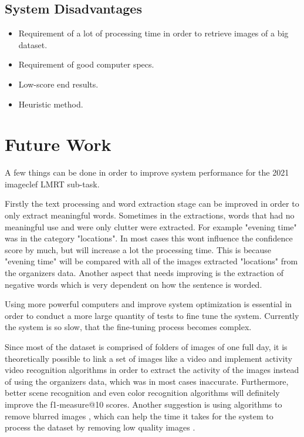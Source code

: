 \subsection{System Disadvantages}

\begin{itemize}
    \itemsep0em
    \item Requirement of a lot of processing time in order to retrieve images of a big dataset.
    \item Requirement of  good computer specs.
    \item Low-score end results.
    \item Heuristic method.
\end{itemize}

\section{Future Work}

A few things can be done in order to improve system performance for the 2021 imageclef LMRT sub-task.

Firstly the text processing and word extraction stage can be improved in order to only extract meaningful words. Sometimes in the extractions, words that had no meaningful use and were only clutter were extracted. For example "evening time" was in the category "locations". In most cases this wont influence the confidence score by much, but will increase a lot the processing time. This is because "evening time" will be compared with all of the images extracted "locations" from the organizers data. Another aspect that needs improving is the extraction of negative words which is very dependent on how the sentence is worded.

Using more powerful computers and improve system optimization is essential in order to conduct a more large quantity of tests to fine tune the system. Currently the system is so slow, that the fine-tuning process becomes complex.

Since most of the dataset is comprised of folders of images of one full day, it is theoretically possible to link a set of images like a video and implement activity video recognition algorithms in order to extract the activity of the images instead of using the organizers data, which was in most cases inaccurate. Furthermore, better scene recognition and even color recognition algorithms will definitely improve the f1-measure@10 scores. Another suggestion is using algorithms to remove blurred images , which can help the time it takes for the system to process the dataset by removing low quality images .

